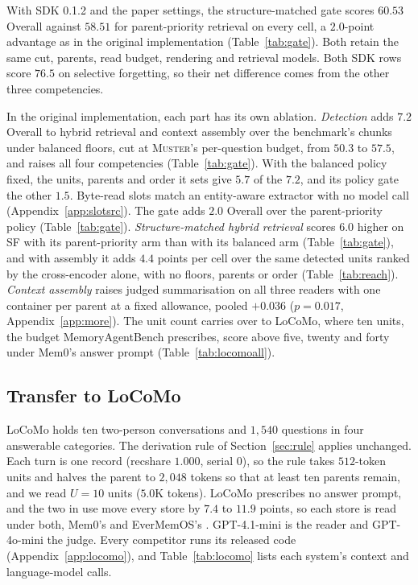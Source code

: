 \documentclass{article}
\newcommand{\sys}{\textsc{Muster}}
\newcommand{\serial}{\textsf{serial}}
\newcommand{\cov}{\textsf{recshare}}
\begin{document}
With SDK 0.1.2 and the paper settings, the structure-matched gate scores $60.53$ Overall against $58.51$ for parent-priority retrieval on every cell, a $2.0$-point advantage as in the original implementation (Table~\ref{tab:gate}). Both retain the same cut, parents, read budget, rendering and retrieval models. Both SDK rows score $76.5$ on selective forgetting, so their net difference comes from the other three competencies.

In the original implementation, each part has its own ablation. \emph{Detection} adds $7.2$ Overall to hybrid retrieval and context assembly over the benchmark's chunks under balanced floors, cut at \sys{}'s per-question budget, from $50.3$ to $57.5$, and raises all four competencies (Table~\ref{tab:gate}). With the balanced policy fixed, the units, parents and order it sets give $5.7$ of the $7.2$, and its policy gate the other $1.5$. Byte-read slots match an entity-aware extractor with no model call (Appendix~\ref{app:slotsrc}). The gate adds $2.0$ Overall over the parent-priority policy (Table~\ref{tab:gate}). \emph{Structure-matched hybrid retrieval} scores $6.0$ higher on SF with its parent-priority arm than with its balanced arm (Table~\ref{tab:gate}), and with assembly it adds $4.4$ points per cell over the same detected units ranked by the cross-encoder alone, with no floors, parents or order (Table~\ref{tab:reach}). \emph{Context assembly} raises judged summarisation on all three readers with one container per parent at a fixed allowance, pooled $+0.036$ ($p=0.017$, Appendix~\ref{app:more}). The unit count carries over to LoCoMo, where ten units, the budget MemoryAgentBench prescribes, score above five, twenty and forty under Mem0's answer prompt (Table~\ref{tab:locomoall}).

\subsection{Transfer to LoCoMo}\label{sec:locomo}

LoCoMo \cite{locomo} holds ten two-person conversations and $1{,}540$ questions in four answerable categories. The derivation rule of Section~\ref{sec:rule} applies unchanged. Each turn is one record (\cov{} $1.000$, \serial{} $0$), so the rule takes $512$-token units and halves the parent to $2{,}048$ tokens so that at least ten parents remain, and we read $U{=}10$ units ($5.0$K tokens). LoCoMo prescribes no answer prompt, and the two in use move every store by $7.4$ to $11.9$ points, so each store is read under both, Mem0's \cite{mem0} and EverMemOS's \cite{evermemos}. GPT-4.1-mini \cite{gpt41} is the reader and GPT-4o-mini \cite{gpt4omini} the judge. Every competitor runs its released code (Appendix~\ref{app:locomo}), and Table~\ref{tab:locomo} lists each system's context and language-model calls.
\end{document}
